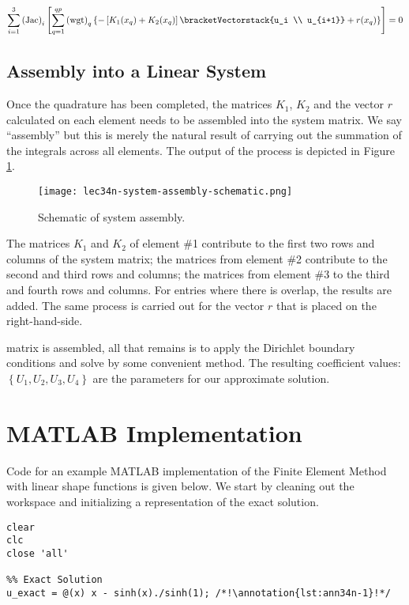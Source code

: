 \begin{equation*}
\sum\limits_{i=1}^{3} \text{(Jac)}_i\left[\sum\limits_{q=1}^{qp} \text{(wgt)}_q \left\{ -\left[K_1(x_{q})+K_2(x_{q}) \right]\bracketVectorstack{u_i \\ u_{i+1}}  + r(x_{q}) \right\}  \right] = 0
\end{equation*}

\subsection{Assembly into a Linear System}
Once the quadrature has been completed, the matrices $K_1$, $K_2$ and the vector $r$ calculated on each element needs to be assembled into the system matrix.  We say ``assembly'' but this is merely the natural result of carrying out the summation of the integrals across all elements.  The output of the process is depicted in Figure \ref{fig:lec34n-system-assembly-schematic}.    
\begin{figure}[h!]
\texttt{[image: lec34n-system-assembly-schematic.png]}
\caption{Schematic of system assembly.}
\label{fig:lec34n-system-assembly-schematic}
\end{figure}
The matrices $K_1$ and $K_2$ of element \#1 contribute to the first two rows and columns of the system matrix; the matrices from element \#2 contribute to the second and third rows and columns; the matrices from element \#3 to the third and fourth rows and columns.  For entries where there is overlap, the results are added.  The same process is carried out for the vector $r$ that is placed on the right-hand-side.

 matrix is assembled, all that remains is to apply the Dirichlet boundary conditions and solve by some convenient method.  The resulting coefficient values: $\left\{U_1, U_2, U_3, U_4\right\}$ are the parameters for our approximate solution.  

\section{MATLAB Implementation}

Code for an example MATLAB implementation of the Finite Element Method with linear shape functions is given below.  We start by cleaning out the workspace and initializing a representation of the exact solution.

\begin{lstlisting}[style=myMatlab,name=lec34n-ex1]
clear
clc
close 'all'

%% Exact Solution
u_exact = @(x) x - sinh(x)./sinh(1); /*!\annotation{lst:ann34n-1}!*/
\end{lstlisting}

